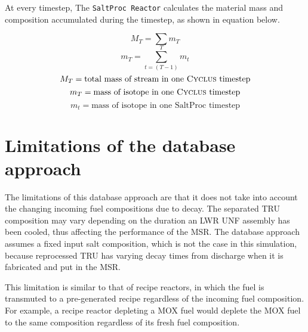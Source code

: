 At every timestep, 
The \texttt{SaltProc Reactor} calculates the material mass
and composition accumulated during the \Cyclus timestep,
as shown in equation below.

\[
M_{T} = \sum m_T
\]
\[
m_{T} = \sum_{t=(T-1)}^{T} m_{t}
\]
\[
M_T = \text{total mass of stream in one \Cyclus timestep}
\]
\[
m_T = \text{mass of isotope in one \Cyclus timestep}
\]
\[
m_t = \text{mass of isotope in one SaltProc timestep}
\]


\section{Limitations of the database approach}
\label{sec:limit}
The limitations of this database approach are that it does not
take into account the changing incoming fuel compositions due to decay.
The separated \gls{TRU} composition may vary depending on the duration
an \gls{LWR} \gls{UNF} assembly has been cooled, thus affecting the performance
of the \gls{MSR}. The database approach assumes a fixed input salt
composition, which is not the case in this simulation, because reprocessed
\gls{TRU} has varying decay times from discharge when it is fabricated and
put in the \gls{MSR}.

This limitation is similar to that of recipe reactors, in which the
fuel is transmuted to a pre-generated recipe regardless of the
incoming fuel composition. For example, a recipe reactor
depleting a \gls{MOX} fuel would deplete the \gls{MOX} fuel
to the same composition regardless of its fresh fuel composition.
